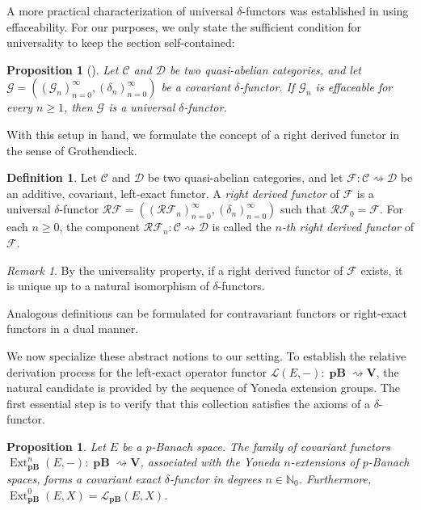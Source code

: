 \documentclass[12pt,a4paper]{amsproc}
\newtheorem{prop}[thm]{Proposition}
\theoremstyle{remark}
\newtheorem{rem}[thm]{Remark}
\theoremstyle{definition}
\newtheorem{defi}[thm]{Definition}
\newcommand{\Ext}{\operatorname{Ext}}
\newcommand{\pBan}{\operatorname{\textbf{pB}}}
\numberwithin{equation}{section}
\begin{document}
A more practical characterization of universal $\delta$-functors was established in \cite[Proposition 2.2.1]{tohoku} using effaceability. For our purposes, we only state the sufficient condition for universality to keep the section self-contained:

\begin{prop}[{\cite[Proposition 2.2.1]{tohoku}}]
	Let $\mathcal{C}$ and $\mathcal{D}$ be two quasi-abelian categories, and let $\mathcal{G}=((\mathcal{G}_n)_{n=0}^{\infty}, (\delta_n)_{n=0}^{\infty})$ be a covariant $\delta$-functor. If $\mathcal{G}_n$ is effaceable for every $n \ge 1$, then $\mathcal{G}$ is a universal $\delta$-functor.
\end{prop}
With this setup in hand, we formulate the concept of a right derived functor in the sense of Grothendieck.

\begin{defi}\label{def:delta-functors_derivado}
	Let $\mathcal{C}$ and $\mathcal{D}$ be two quasi-abelian categories, and let $\mathcal{F}: \mathcal{C} \rightsquigarrow \mathcal{D}$ be an additive, covariant, left-exact functor. A \emph{right derived functor} of $\mathcal{F}$ is a universal $\delta$-functor $\mathcal{RF}=((\mathcal{RF}_n)_{n=0}^{\infty}, (\delta_n)_{n=0}^{\infty})$ such that $\mathcal{RF}_0 = \mathcal{F}$. For each $n \ge 0$, the component $\mathcal{RF}_n: \mathcal{C} \rightsquigarrow \mathcal{D}$ is called the \emph{$n$-th right derived functor} of $\mathcal{F}$.
\end{defi}

\begin{rem}
	By the universality property, if a right derived functor of $\mathcal{F}$ exists, it is unique up to a natural isomorphism of $\delta$-functors.
\end{rem}

Analogous definitions can be formulated for contravariant functors or right-exact functors in a dual manner.

\medskip

We now specialize these abstract notions to our setting. To establish the relative derivation process for the left-exact operator functor $\mathcal{L}(E,-): \boldsymbol{\pBan} \rightsquigarrow \mathbf{V}$, the natural candidate is provided by the sequence of Yoneda extension groups. The first essential step is to verify that this collection satisfies the axioms of a $\delta$-functor.

\begin{prop}
	Let $E$ be a $p$-Banach space. The family of covariant functors $\Ext^n_{\boldsymbol{\pBan}}(E,-): \boldsymbol{\pBan} \rightsquigarrow \mathbf{V}$, associated with the Yoneda $n$-extensions of $p$-Banach spaces, forms a covariant exact $\delta$-functor in degrees $n \in \mathbb{N}_0$. Furthermore, $\Ext^0_{\boldsymbol{\pBan}}(E,X) = \mathcal{L}_{\boldsymbol{\pBan}}(E,X)$.
\end{prop}
\end{document}
